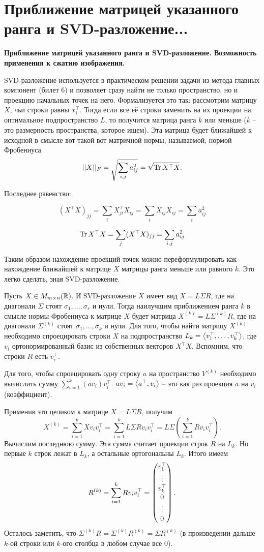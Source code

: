 \section{
 Приближение матрицей указанного ранга и SVD-разложение...
}
\textbf{Приближение матрицей указанного ранга и SVD-разложение. Возможность применения к сжатию изображения.}

SVD-разложение используется в практическом решении задачи из метода главных компонент (билет 6) и позволяет сразу найти не только пространство, но и проекцию начальных точек на него. Формализуется это так: рассмотрим матрицу $X$, чьи строки равны $x_i^{\top}$. Тогда если все её строки заменить на их проекции на оптимальное подпространство $L$, то получится матрица ранга $k$ или меньше ($k$ -- это размерность пространства, которое ищем). Эта матрица будет ближайшей к исходной в смысле вот такой вот матричной нормы, называемой, нормой Фробениуса 
$$||X||_F=\sqrt{\sum_{i,j} a_{ij}^2}=\sqrt{\operatorname{Tr} X^{\top}X}.$$

Последнее равенство:

$$(X^{\top}X)_{jj} = \sum\limits_{i} X^{\top}_{ji}X_{ij} = \sum\limits_{i} X_{ij}X_{ij} = \sum\limits_{i} a_{ij}^2$$

$$\operatorname{Tr} X^{\top}X = \sum\limits_{j} (X^{\top}X)_{jj} = \sum\limits_{i,j} a_{ij}^2$$

Таким образом нахождение проекций точек можно переформулировать как нахождение ближайшей к матрице $X$ матрицы ранга меньше или равного $k$. Это легко сделать, зная SVD-разложение.

\thrm Пусть $X\in M_{m\times n}(\mathbb{R})$. И SVD-разложение $X$ имеет вид $X=L\Sigma R$, где на диагонали $\Sigma$ стоят $\sigma_1,\dots,\sigma_r$ и нули. Тогда наилучшим приближением ранга $k$ в смысле нормы Фробениуса к матрице $X$ будет матрица $X^{(k)}=L\Sigma^{(k)}R$, где на диагонали $\Sigma^{(k)}$ стоят $\sigma_1,\dots,\sigma_{k}$ и нули.
\proof Для того, чтобы найти матрицу $X^{(k)}$ необходимо спроецировать строки $X$ на подпространство $L_k=\left\langle v_1^{\top},\dots,v_k^{\top}\right\rangle$, где $v_i$ ортонормированный базис из собственных векторов $X^{\top}X$.  Вспомним, что строки $R$ есть $v_i^{\top}$.

Для того, чтобы спроецировать одну строку $a$ на пространство $V^{(k)}$ необходимо вычислить сумму $\sum_{i=1}^k (av_i) v_i^{\top}$. $av_i = \left\langle a^{\top}, v_i \right\rangle$ -- это как раз проекция $a$ на $v_i$ (коэффициент).

Применив это целиком к матрице $X=L\Sigma R$, получим 
$$X^{(k)}=\sum_{i=1}^k Xv_iv_i^{\top}=\sum_{i=1}^k L\Sigma Rv_iv_i^{\top}=L\Sigma \left(\sum_{i=1}^k Rv_iv_i^{\top}\right).$$
Вычислим последнюю сумму. Эта сумма считает проекции строк $R$ на $L_k$. Но первые $k$ строк лежат в $L_k$, а остальные ортогональны $L_k$. Итого имеем
$$R^{(k)}=\sum_{i=1}^k Rv_iv_i^{\top} = \begin{pmatrix} v_1^{\top} \\ \vdots \\ v_k^{\top} \\ 0 \\ \vdots \\ 0 \end{pmatrix}.$$
Осталось заметить, что $\Sigma^{(k)} R= \Sigma^{(k)}R^{(k)}=\Sigma R^{(k)}$ (в произведении дальше $k$-ой строки или $k$-ого столбца в любом случае все 0).
\endproof
\ethrm 

